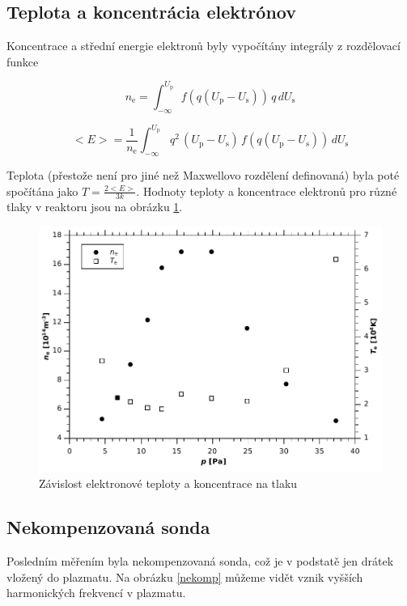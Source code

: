\documentclass[12pt]{article}
\begin{document}
\subsection{Teplota a koncentrácia elektrónov}

Koncentrace a střední energie elektronů byly vypočítány integrály z rozdělovací funkce

\begin{equation}
n_\mathrm{e} = \int_{-\infty}^{U_\mathrm{p}} f(q(U_\mathrm{p}-U_\mathrm{s}))\,q\,dU_\mathrm{s}
\end{equation}

\begin{equation}
<E> =  \frac{1}{n_\mathrm{e}} \int_{-\infty}^{U_\mathrm{p}}\,q^2\,(U_\mathrm{p}-U_\mathrm{s})\,f(q(U_\mathrm{p}-U_\mathrm{s}))\, dU_\mathrm{s}
\end{equation}

Teplota (přestože není pro jiné než Maxwellovo rozdělení definovaná) byla poté spočítána jako $T = \frac{2<E>}{3 k}$. Hodnoty teploty a koncentrace elektronů pro různé tlaky v reaktoru jsou na obrázku \ref{final}.

\begin{figure}[htbp]
\begin{center}
\includegraphics[width=12.8cm]{img/final.pdf}
\caption{Závislost elektronové teploty a koncentrace na tlaku}
\label{final}
\end{center}
\end{figure}

\subsection{Nekompenzovaná sonda}
Posledním měřením byla nekompenzovaná sonda, což je v podstatě jen drátek vložený do plazmatu. Na obrázku \ref{nekomp} můžeme vidět vznik vyšších harmonických frekvencí v plazmatu.
\end{document}

